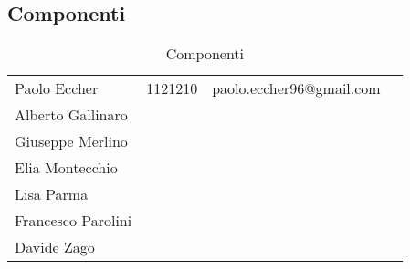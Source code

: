 	\subsection{Componenti}	
	\begin{table}[H]
		\centering
		\begin{tabular}{|p{2cm}|C{3cm}|C{5.5cm}|C{3cm}|}
			\hline
			 &  & & \\
			\hline			
			Paolo Eccher & 1121210 & paolo.eccher96@gmail.com  &   \\
			\hline
			Alberto Gallinaro & &  &  \\
			\hline
			Giuseppe Merlino & &  &  \\
			\hline
			Elia Montecchio & & & \\
			\hline
			Lisa Parma & &  & \\
			\hline
			Francesco Parolini & &  & \\
			\hline
			Davide Zago & & & \\
			\hline
		\end{tabular}
		\caption{Componenti}
	\end{table}
	
	